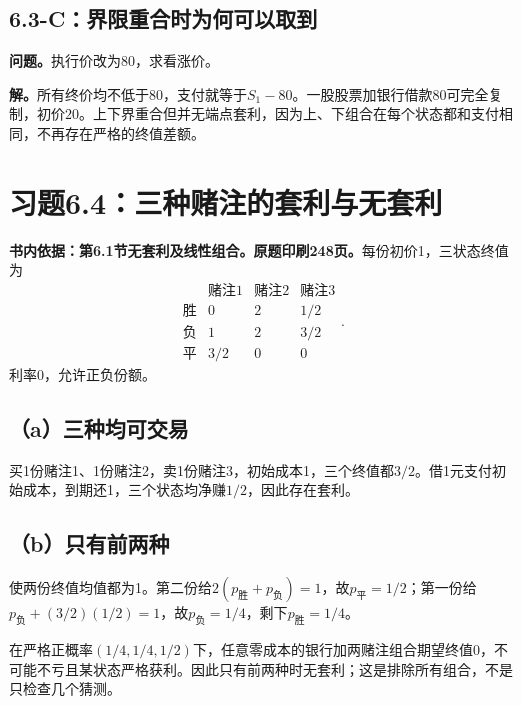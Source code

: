 \documentclass[11pt,a4paper,UTF8,fontset=fandol]{ctexart}
\begin{document}
\subsection{6.3-C：界限重合时为何可以取到}\label{cux754cux9650ux91cdux5408ux65f6ux4e3aux4f55ux53efux4ee5ux53d6ux5230}

\textbf{问题。}执行价改为80，求看涨价。

\textbf{解。}所有终价均不低于80，支付就等于\(S_1-80\)。一股股票加银行借款80可完全复制，初价\(\boxed{20}\)。上下界重合但并无端点套利，因为上、下组合在每个状态都和支付相同，不再存在严格的终值差额。

\bigskip

\section{习题6.4：三种赌注的套利与无套利}\label{ux4e60ux98986.4ux4e09ux79cdux8d4cux6ce8ux7684ux5957ux5229ux4e0eux65e0ux5957ux5229}

\textbf{书内依据：第6.1节无套利及线性组合。原题印刷248页。}每份初价1，三状态终值为
\[\begin{array}{c|ccc}&\text{赌注1}&\text{赌注2}&\text{赌注3}\\\hline
\text{胜}&0&2&1/2\\\text{负}&1&2&3/2\\\text{平}&3/2&0&0
\end{array}.\] 利率0，允许正负份额。

\subsection{（a）三种均可交易}\label{aux4e09ux79cdux5747ux53efux4ea4ux6613}

买1份赌注1、1份赌注2，卖1份赌注3，初始成本1，三个终值都\(3/2\)。借1元支付初始成本，到期还1，三个状态均净赚\(\boxed{1/2}\)，因此存在套利。

\subsection{（b）只有前两种}\label{bux53eaux6709ux524dux4e24ux79cd}

使两份终值均值都为1。第二份给\(2(p_{\text{胜}}+p_{\text{负}})=1\)，故\(p_{\text{平}}=1/2\)；第一份给\(p_{\text{负}}+(3/2)(1/2)=1\)，故\(p_{\text{负}}=1/4\)，剩下\(p_{\text{胜}}=1/4\)。

在严格正概率\((1/4,1/4,1/2)\)下，任意零成本的银行加两赌注组合期望终值0，不可能不亏且某状态严格获利。因此只有前两种时无套利；这是排除所有组合，不是只检查几个猜测。
\end{document}
